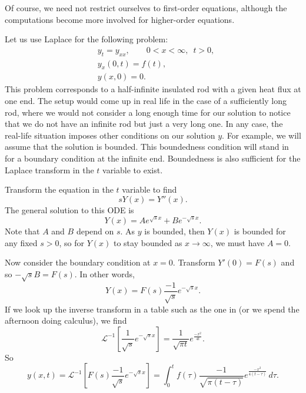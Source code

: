 Of course, we need not restrict ourselves to first-order equations, although
the computations become more involved for higher-order equations.

\begin{example}
Let us use Laplace for the following problem:
\begin{align*}
& y_t = y_{xx}, \qquad 0 < x < \infty, \enspace t > 0,\\
& y_x(0,t) = f(t), \\
& y(x,0) = 0 .
\end{align*}
This problem corresponds to a half-infinite insulated rod with a given
heat flux at one end.
The setup would come up in real life in the case of a
sufficiently long rod, where we would not consider a long enough time
for our solution to notice that we do not have an infinite rod but just a
very long one.
In any case, the real-life situation imposes other conditions
on our solution $y$.
For example, we will assume that the solution is bounded.
This boundedness condition will stand in for a boundary condition at the
infinite end.
Boundedness
is also sufficient for the Laplace transform in the $t$ variable to exist.

Transform the equation in the $t$ variable to find
\begin{equation*}
sY(x) = Y''(x) .
\end{equation*}
The general solution to this ODE is
\begin{equation*}
Y(x) = A e^{\sqrt{s}x} + B e^{-\sqrt{s} x} .
\end{equation*}
Note that $A$ and $B$ depend on $s$.
As $y$ is bounded, then $Y(x)$ is bounded for any fixed $s > 0$,
so for $Y(x)$ to stay bounded as $x \to \infty$, we must have $A=0$.

Now consider the boundary condition at $x=0$.
Transform $Y'(0) = F(s)$ and so $-\sqrt{s}B = F(s)$.
In other words,
\begin{equation*}
Y(x) = F(s) \frac{-1}{\sqrt{s}} e^{-\sqrt{s} x} .
\end{equation*}
If we look up the inverse transform in a table such as the one in
 (or we spend the afternoon
doing calculus),
we find 
\begin{equation*}
{\mathcal L}^{-1}\left[\frac{1}{\sqrt{s}} e^{-\sqrt{s} x}\right] =
\frac{1}{\sqrt{\pi t}} e^{\frac{-x^2}{4t}} .
\end{equation*}
So
\begin{equation*}
y(x,t) =
{\mathcal L}^{-1} \left[
F(s) \frac{-1}{\sqrt{s}} e^{-\sqrt{s} x}\right]
=
\int_0^t
f(\tau) 
\frac{-1}{\sqrt{\pi {(t-\tau)}}} e^{\frac{-x^2}{4(t-\tau)}} \, d\tau .
\end{equation*}
\end{example}

